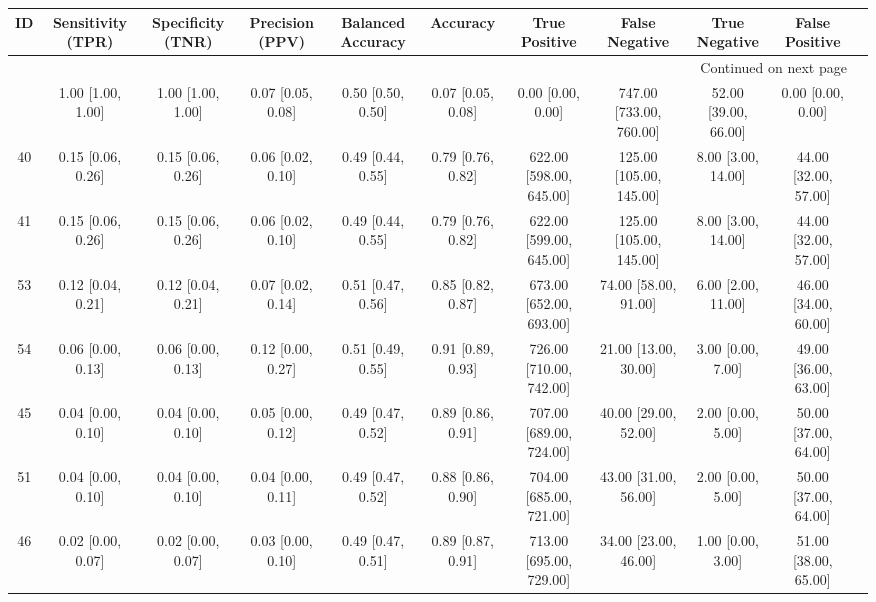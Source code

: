 \documentclass[8pt]{article}
\begin{document}
\begin{center}
\begin{footnotesize}
\begin{longtable}{|ccccccccccc|}
\toprule
 ID &  Sensitivity (TPR) &  Specificity (TNR) &    Precision (PPV) &  Balanced Accuracy &           Accuracy &            True Positive &           False Negative &         True Negative &        False Positive \\
\midrule
\endhead
\midrule
\multicolumn{10}{r}{{Continued on next page}} \\
\midrule
\endfoot

\bottomrule
\endlastfoot
 42 &  1.00 [1.00, 1.00] &  1.00 [1.00, 1.00] &  0.07 [0.05, 0.08] &  0.50 [0.50, 0.50] &  0.07 [0.05, 0.08] &        0.00 [0.00, 0.00] &  747.00 [733.00, 760.00] &  52.00 [39.00, 66.00] &     0.00 [0.00, 0.00] \\
 40 &  0.15 [0.06, 0.26] &  0.15 [0.06, 0.26] &  0.06 [0.02, 0.10] &  0.49 [0.44, 0.55] &  0.79 [0.76, 0.82] &  622.00 [598.00, 645.00] &  125.00 [105.00, 145.00] &    8.00 [3.00, 14.00] &  44.00 [32.00, 57.00] \\
 41 &  0.15 [0.06, 0.26] &  0.15 [0.06, 0.26] &  0.06 [0.02, 0.10] &  0.49 [0.44, 0.55] &  0.79 [0.76, 0.82] &  622.00 [599.00, 645.00] &  125.00 [105.00, 145.00] &    8.00 [3.00, 14.00] &  44.00 [32.00, 57.00] \\
 53 &  0.12 [0.04, 0.21] &  0.12 [0.04, 0.21] &  0.07 [0.02, 0.14] &  0.51 [0.47, 0.56] &  0.85 [0.82, 0.87] &  673.00 [652.00, 693.00] &     74.00 [58.00, 91.00] &    6.00 [2.00, 11.00] &  46.00 [34.00, 60.00] \\
 54 &  0.06 [0.00, 0.13] &  0.06 [0.00, 0.13] &  0.12 [0.00, 0.27] &  0.51 [0.49, 0.55] &  0.91 [0.89, 0.93] &  726.00 [710.00, 742.00] &     21.00 [13.00, 30.00] &     3.00 [0.00, 7.00] &  49.00 [36.00, 63.00] \\
 45 &  0.04 [0.00, 0.10] &  0.04 [0.00, 0.10] &  0.05 [0.00, 0.12] &  0.49 [0.47, 0.52] &  0.89 [0.86, 0.91] &  707.00 [689.00, 724.00] &     40.00 [29.00, 52.00] &     2.00 [0.00, 5.00] &  50.00 [37.00, 64.00] \\
 51 &  0.04 [0.00, 0.10] &  0.04 [0.00, 0.10] &  0.04 [0.00, 0.11] &  0.49 [0.47, 0.52] &  0.88 [0.86, 0.90] &  704.00 [685.00, 721.00] &     43.00 [31.00, 56.00] &     2.00 [0.00, 5.00] &  50.00 [37.00, 64.00] \\
 46 &  0.02 [0.00, 0.07] &  0.02 [0.00, 0.07] &  0.03 [0.00, 0.10] &  0.49 [0.47, 0.51] &  0.89 [0.87, 0.91] &  713.00 [695.00, 729.00] &     34.00 [23.00, 46.00] &     1.00 [0.00, 3.00] &  51.00 [38.00, 65.00] \\

\end{longtable}
\end{footnotesize}
\end{center}
\end{document}
